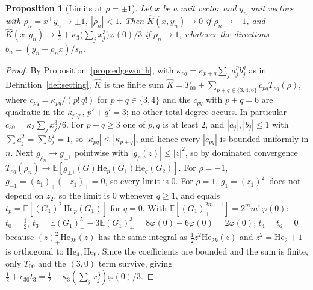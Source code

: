 \documentclass[11pt]{article}
\newtheorem{proposition}{Proposition}
\theoremstyle{definition}
\newcommand{\E}{\mathbb{E}}
\newcommand{\He}{\mathrm{He}}
\begin{document}
\begin{proposition}[Limits at $\rho=\pm1$]\label{prop:limits}
Let $x$ be a unit vector and $y_n$ unit vectors with $\rho_n=x^\top y_n\to\pm1$,
$|\rho_n|<1$. Then $\widehat K(x,y_n)\to0$ if $\rho_n\to-1$, and
$\widehat K(x,y_n)\to\tfrac12+\kappa_3\big(\sum_jx_j^3\big)\varphi(0)/3$ if
$\rho_n\to1$, whatever the directions $b_n=(y_n-\rho_nx)/s_n$.
\end{proposition}

\begin{proof}
By Proposition~\ref{prop:edgeworth}, with $\kappa_{pq}=\kappa_{p+q}\sum_ja_j^pb_j^q$ as in
Definition~\ref{def:setting}, $\widehat K$ is the finite sum
$\widehat K=T_{00}+\sum_{p+q\in\{3,4,6\}}c_{pq}T_{pq}(\rho)$, where $c_{pq}=\kappa_{pq}/(p!\,q!)$
for $p+q\in\{3,4\}$ and the $c_{pq}$ with $p+q=6$ are quadratic in the $\kappa_{p'q'}$,
$p'+q'=3$; no other total degree occurs. In particular $c_{30}=\kappa_3\sum_jx_j^3/6$.
For $p+q\ge3$ one of $p,q$ is at least $2$, and $|a_j|,|b_j|\le1$ with
$\sum a_j^2=\sum b_j^2=1$, so $|\kappa_{pq}|\le|\kappa_{p+q}|$, and hence every $|c_{pq}|$
is bounded uniformly in $n$.
Next $g_{\rho_n}\to g_{\pm1}$ pointwise with $|g_{\rho}(z)|\le|z|^2$, so by dominated
convergence $T_{pq}(\rho_n)\to\E[g_{\pm1}(G)\He_p(G_1)\He_q(G_2)]$. For $\rho=-1$,
$g_{-1}=(z_1)_+(-z_1)_+=0$, so every limit is $0$. For $\rho=1$, $g_1=(z_1)_+^2$ does not
depend on $z_2$, so the limit is $0$ whenever $q\ge1$, and equals
$t_p=\E[(G_1)_+^2\He_p(G_1)]$ for $q=0$. With $\E[(G_1)_+^{2m+1}]=2^mm!\,\varphi(0)$:
$t_0=\tfrac12$, $t_3=\E(G_1)_+^5-3\E(G_1)_+^3=8\varphi(0)-6\varphi(0)=2\varphi(0)$;
$t_4=t_6=0$ because $(z)_+^2\He_{2k}(z)$ has the same integral as
$\tfrac12z^2\He_{2k}(z)$ and $z^2=\He_2+1$ is orthogonal to $\He_4,\He_6$. Since the coefficients are bounded and the
sum is finite, only $T_{00}$ and the $(3,0)$ term survive, giving
$\tfrac12+c_{30}t_3=\tfrac12+\kappa_3(\sum_jx_j^3)\varphi(0)/3$.
\end{proof}
\end{document}
